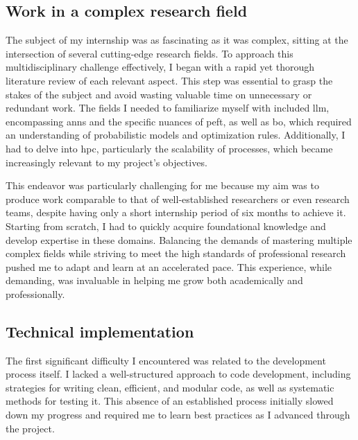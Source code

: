 \subsection{Work in a complex research field}
\label{sec:complex_field}
The subject of my internship was as fascinating as it was complex, sitting at the intersection of several cutting-edge research fields. To approach this multidisciplinary challenge effectively, I began with a rapid yet thorough literature review of each relevant aspect. This step was essential to grasp the stakes of the subject and avoid wasting valuable time on unnecessary or redundant work. The fields I needed to familiarize myself with included \acrshort{llm}, encompassing \acrshort{ann}s and the specific nuances of \acrlong{peft}, as well as \acrlong{bo}, which required an understanding of probabilistic models and optimization rules. Additionally, I had to delve into \acrfull{hpc}, particularly the scalability of processes, which became increasingly relevant to my project’s objectives.

This endeavor was particularly challenging for me because my aim was to produce work comparable to that of well-established researchers or even research teams, despite having only a short internship period of six months to achieve it. Starting from scratch, I had to quickly acquire foundational knowledge and develop expertise in these domains. Balancing the demands of mastering multiple complex fields while striving to meet the high standards of professional research pushed me to adapt and learn at an accelerated pace. This experience, while demanding, was invaluable in helping me grow both academically and professionally.


\subsection{Technical implementation}
\label{sec:tech_impl}

The first significant difficulty I encountered was related to the development process itself. I lacked a well-structured approach to code development, including strategies for writing clean, efficient, and modular code, as well as systematic methods for testing it. This absence of an established process initially slowed down my progress and required me to learn best practices as I advanced through the project.

